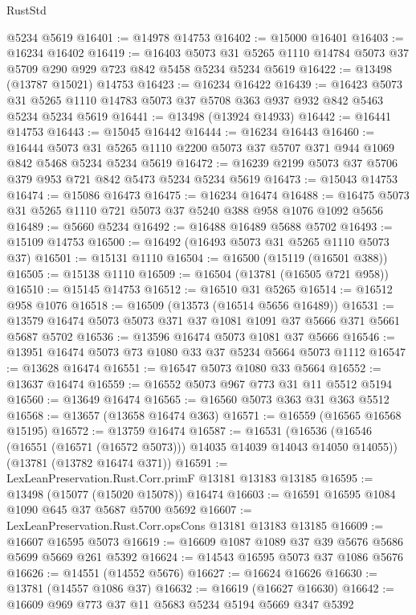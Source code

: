 \begin{lexlean}{RustStd}
\begin{coremodule}
    @5234
    @5619
@16401 := @14978 @14753
@16402 := @15000 @16401
@16403 := @16234 @16402
@16419 := @16403
    @5073
    @31
    @5265
    @1110
    @14784
    @5073
    @37
    @5709
    @290
    @929
    @723
    @842
    @5458
    @5234
    @5234
    @5619
@16422 := @13498 (@13787 @15021) @14753
@16423 := @16234 @16422
@16439 := @16423
    @5073
    @31
    @5265
    @1110
    @14783
    @5073
    @37
    @5708
    @363
    @937
    @932
    @842
    @5463
    @5234
    @5234
    @5619
@16441 := @13498 (@13924 @14933)
@16442 := @16441 @14753
@16443 := @15045 @16442
@16444 := @16234 @16443
@16460 := @16444
    @5073
    @31
    @5265
    @1110
    @2200
    @5073
    @37
    @5707
    @371
    @944
    @1069
    @842
    @5468
    @5234
    @5234
    @5619
@16472 := @16239 @2199 @5073 @37 @5706 @379 @953 @721 @842 @5473 @5234 @5234 @5619
@16473 := @15043 @14753
@16474 := @15086 @16473
@16475 := @16234 @16474
@16488 := @16475 @5073 @31 @5265 @1110 @721 @5073 @37 @5240 @388 @958 @1076 @1092 @5656
@16489 := @5660 @5234
@16492 := @16488 @16489 @5688 @5702
@16493 := @15109 @14753
@16500 := @16492 (@16493 @5073 @31 @5265 @1110 @5073 @37)
@16501 := @15131 @1110
@16504 := @16500 (@15119 (@16501 @388))
@16505 := @15138 @1110
@16509 := @16504 (@13781 (@16505 @721 @958))
@16510 := @15145 @14753
@16512 := @16510 @31 @5265
@16514 := @16512 @958 @1076
@16518 := @16509 (@13573 (@16514 @5656 @16489))
@16531 := @13579 @16474 @5073 @5073 @371 @37 @1081 @1091 @37 @5666 @371 @5661 @5687 @5702
@16536 := @13596 @16474 @5073 @1081 @37 @5666
@16546 := @13951 @16474 @5073 @73 @1080 @33 @37 @5234 @5664 @5073 @1112
@16547 := @13628 @16474
@16551 := @16547 @5073 @1080 @33 @5664
@16552 := @13637 @16474
@16559 := @16552 @5073 @967 @773 @31 @11 @5512 @5194
@16560 := @13649 @16474
@16565 := @16560 @5073 @363 @31 @363 @5512
@16568 := @13657 (@13658 @16474 @363)
@16571 := @16559 (@16565 @16568 @15195)
@16572 := @13759 @16474
@16587 := @16531
    (@16536 (@16546 (@16551 (@16571 (@16572 @5073))) @14035 @14039 @14043 @14050 @14055))
    (@13781 (@13782 @16474 @371))
@16591 := LexLeanPreservation.Rust.Corr.primF @13181 @13183 @13185
@16595 := @13498 (@15077 (@15020 @15078)) @16474
@16603 := @16591 @16595 @1084 @1090 @645 @37 @5687 @5700 @5692
@16607 := LexLeanPreservation.Rust.Corr.opsCons @13181 @13183 @13185
@16609 := @16607 @16595 @5073
@16619 := @16609 @1087 @1089 @37 @39 @5676 @5686 @5699 @5669 @261 @5392
@16624 := @14543 @16595 @5073 @37 @1086 @5676
@16626 := @14551 (@14552 @5676)
@16627 := @16624 @16626
@16630 := @13781 (@14557 @1086 @37)
@16632 := @16619 (@16627 @16630)
@16642 := @16609 @969 @773 @37 @11 @5683 @5234 @5194 @5669 @347 @5392

\end{coremodule}
\end{lexlean}
